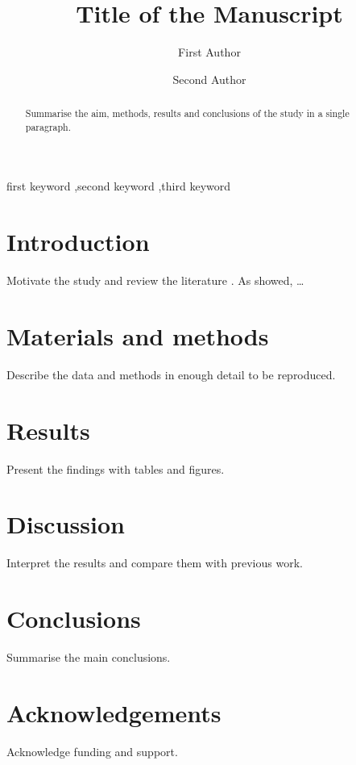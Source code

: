 \documentclass[preprint,12pt,authoryear]{elsarticle}
\begin{document}
\begin{frontmatter}

\title{Title of the Manuscript}

\author[mmu]{First Author}
\author[mmu]{Second Author}


\begin{abstract}
Summarise the aim, methods, results and conclusions of the study in a single paragraph.
\end{abstract}

\begin{keyword}
first keyword \sep second keyword \sep third keyword
\end{keyword}

\end{frontmatter}

\linenumbers

\section{Introduction}
\label{sec:intro}
Motivate the study and review the literature \citep{smith2020, lee2022}. As \citet{smith2020} showed, \ldots

\section{Materials and methods}
\label{sec:methods}
Describe the data and methods in enough detail to be reproduced.

\section{Results}
\label{sec:results}
Present the findings with tables and figures.

\section{Discussion}
Interpret the results and compare them with previous work.

\section{Conclusions}
Summarise the main conclusions.

\section*{Acknowledgements}
Acknowledge funding and support.



\end{document}
